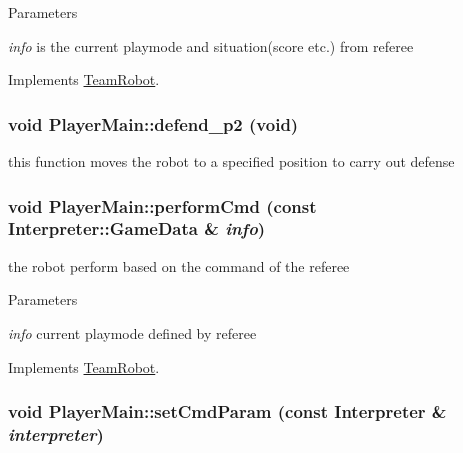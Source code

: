 \begin{DoxyParams}{Parameters}
\item[{\em info}]is the current playmode and situation(score etc.) from referee \end{DoxyParams}


Implements \hyperlink{classTeamRobot_a71ec65db46db1ac511fe17b668d4f192}{TeamRobot}.

\hypertarget{classPlayerMain_a64e1d5734e07cfa82b2571aa11bb4f9d}{
\subsubsection[{defend\_\-p2}]{\setlength{\rightskip}{0pt plus 5cm}void PlayerMain::defend\_\-p2 (void)}}
\label{classPlayerMain_a64e1d5734e07cfa82b2571aa11bb4f9d}


this function moves the robot to a specified position to carry out defense 

\hypertarget{classPlayerMain_af12a95c226ce973056681a138b55fb6c}{
\subsubsection[{performCmd}]{\setlength{\rightskip}{0pt plus 5cm}void PlayerMain::performCmd (const {\bf Interpreter::GameData} \& {\em info})}}
\label{classPlayerMain_af12a95c226ce973056681a138b55fb6c}


the robot perform based on the command of the referee 


\begin{DoxyParams}{Parameters}
\item[{\em info}]current playmode defined by referee \end{DoxyParams}


Implements \hyperlink{classTeamRobot_a9b84df51ca16a7203fdb6498ea6741da}{TeamRobot}.

\hypertarget{classPlayerMain_a5c4af159392663660f91809052422945}{
\subsubsection[{setCmdParam}]{\setlength{\rightskip}{0pt plus 5cm}void PlayerMain::setCmdParam (const {\bf Interpreter} \& {\em interpreter})}}
\label{classPlayerMain_a5c4af159392663660f91809052422945}


